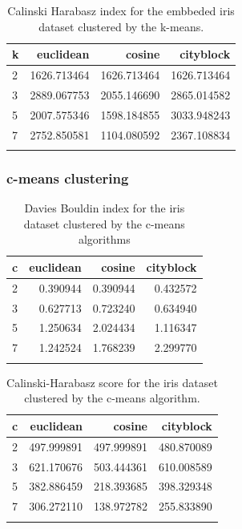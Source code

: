 \documentclass[conference]{IEEEtran}
\begin{document}
\begin{table}[ht!]
    \centering
    \begin{tabular}{lrrr}
    \toprule
    k &    euclidean &       cosine &    cityblock \\
    \midrule
    2 &  1626.713464 &  1626.713464 &  1626.713464 \\
    3 &  2889.067753 &  2055.146690 &  2865.014582 \\
    5 &  2007.575346 &  1598.184855 &  3033.948243 \\
    7 &  2752.850581 &  1104.080592 &  2367.108834 \\
    \bottomrule\\
    \end{tabular}
\caption{Calinski Harabasz index for the embbeded iris dataset clustered by the k-means.}
    \label{tab:ie_ch_km}
\end{table}

\subsubsection{c-means clustering}

\begin{table}[ht!]
    \centering
    \begin{tabular}{lrrr}
\toprule
c &  euclidean &    cosine &  cityblock \\
\midrule
2 &   0.390944 &  0.390944 &   0.432572 \\
3 &   0.627713 &  0.723240 &   0.634940 \\
5 &   1.250634 &  2.024434 &   1.116347 \\
7 &   1.242524 &  1.768239 &   2.299770 \\
\bottomrule \\
\end{tabular}
    \caption{Davies Bouldin index for the iris dataset clustered by the c-means algorithms}
    \label{tab:i1_db_c}
\end{table}

\begin{table}[ht!]
    \centering
    \begin{tabular}{lrrr}
\toprule
c &   euclidean &      cosine &   cityblock \\
\midrule
2 &  497.999891 &  497.999891 &  480.870089 \\
3 &  621.170676 &  503.444361 &  610.008589 \\
5 &  382.886459 &  218.393685 &  398.329348 \\
7 &  306.272110 &  138.972782 &  255.833890 \\
\bottomrule \\
\end{tabular}
    \caption{Calinski-Harabasz score for the iris dataset clustered by the c-means algorithm.}
    \label{tab:i1_ch_c}
\end{table}
\end{document}
